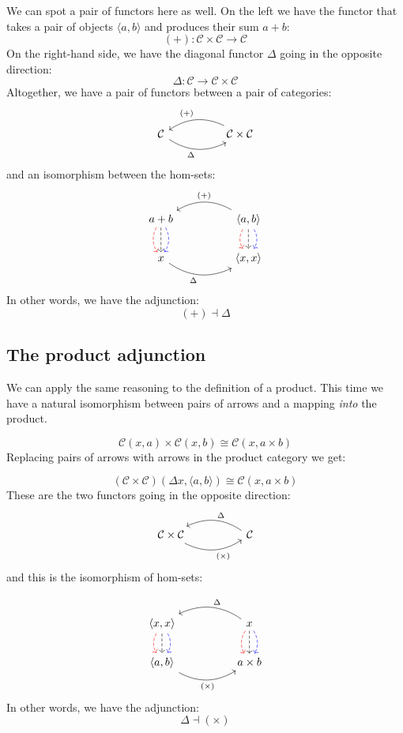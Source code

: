 \documentclass[DaoFP]{subfiles}
\begin{document}
We can spot a pair of functors here as well. On the left we have the functor that takes a pair of objects $\langle a, b \rangle$ and produces their sum $a + b$:
\[ (+) \colon \mathcal{C} \times \mathcal{C} \to \mathcal{C}\]
On the right-hand side, we have the diagonal functor $\Delta$ going in the opposite direction:
\[ \Delta \colon \mathcal{C} \to  \mathcal{C} \times \mathcal{C} \]
Altogether, we have a pair of functors between a pair of categories:
\[
 \begin{tikzcd}
  \mathcal{C}
   \arrow[rr, bend right, "\Delta"']
  &&
  \mathcal{C} \times \mathcal{C}
 \arrow[ll, bend right, "(+)"']
  \end{tikzcd}
\]
and an isomorphism between the hom-sets:
\[
 \begin{tikzcd}
a + b
\arrow[d, bend right, red, dashed]
\arrow[d, dashed]
\arrow[d, bend left, blue, dashed]
  &&
 \langle a , b \rangle
\arrow[d, bend right, red, dashed]
\arrow[d, dashed]
\arrow[d, bend left, blue, dashed]
 \arrow[ll, bend right, "(+)"']
 \\
 x
   \arrow[rr, bend right, "\Delta"']
 &&
 \langle x, x \rangle
  \end{tikzcd}
\]
In other words, we have the adjunction:
\[ (+) \dashv \Delta \]


\subsection{The product adjunction}

We can apply the same reasoning to the definition of a product. This time we have a natural isomorphism between pairs of arrows and a mapping \emph{into} the product.

\[  \mathcal{C} (x, a) \times \mathcal{C}(x, b) \cong  \mathcal{C} (x, a \times b)  \]
Replacing pairs of arrows with arrows in the product category we get:

\[  (\mathcal{C} \times \mathcal{C})( \Delta x,  \langle a, b \rangle ) \cong  \mathcal{C} (x, a \times b)  \]
These are the two functors going in the opposite direction:
\[
 \begin{tikzcd}
  \mathcal{C} \times \mathcal{C}
  \arrow[rr, bend right, "(\times)"']
  &&
  \mathcal{C}
  \arrow[ll, bend right, "\Delta"']
  \end{tikzcd}
\]
and this is the isomorphism of hom-sets:

\[
 \begin{tikzcd}
 \langle x, x \rangle
\arrow[d, bend right, red, dashed]
\arrow[d, dashed]
\arrow[d, bend left, blue, dashed]
  &&
  x
\arrow[d, bend right, red, dashed]
\arrow[d, dashed]
\arrow[d, bend left, blue, dashed]
 \arrow[ll, bend right, "\Delta"']
 \\
 \langle a , b \rangle
   \arrow[rr, bend right, "(\times)"']
 &&
 a \times b
  \end{tikzcd}
\]
In other words, we have the adjunction:
\[ \Delta \dashv (\times) \]
\end{document}
